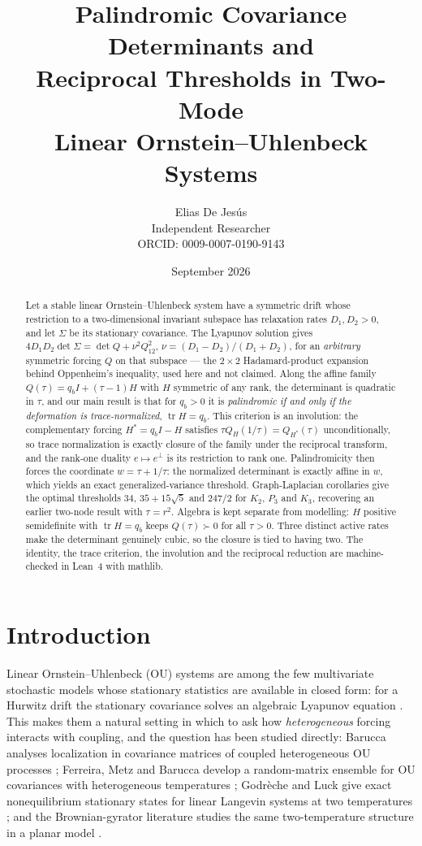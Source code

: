 \documentclass[11pt]{article}
\title{Palindromic Covariance Determinants and\\
Reciprocal Thresholds in Two-Mode\\
Linear Ornstein--Uhlenbeck Systems}
\author{Elias De Jes\'us\\
Independent Researcher\\
ORCID: 0009-0007-0190-9143}
\date{September 2026}
\theoremstyle{plain}
\theoremstyle{definition}
\theoremstyle{remark}
\newcommand{\tr}{\operatorname{tr}}
\newcommand{\Sig}{\Sigma}
\newcommand{\eperp}{e^{\perp}}
\begin{document}
\maketitle

\begin{abstract}
Let a stable linear Ornstein--Uhlenbeck system have a symmetric drift whose restriction to a
two-dimensional invariant subspace has relaxation rates $D_1,D_2>0$, and let $\Sig$ be its
stationary covariance. The Lyapunov solution gives
$4D_1D_2\det\Sig=\det Q+\nu^2Q_{12}^2$, $\nu=(D_1-D_2)/(D_1+D_2)$, for an \emph{arbitrary}
symmetric forcing $Q$ on that subspace --- the $2\times2$ Hadamard-product expansion behind
Oppenheim's inequality, used here and not claimed. Along the affine family
$Q(\tau)=q_bI+(\tau-1)H$ with $H$ symmetric of any rank, the determinant is quadratic in $\tau$,
and our main result is that for $q_b>0$ it is \emph{palindromic if and only if the deformation is
trace-normalized}, $\tr H=q_b$. This criterion is an involution: the complementary forcing
$H^{*}=q_bI-H$ satisfies $\tau Q_H(1/\tau)=Q_{H^{*}}(\tau)$ unconditionally, so trace
normalization is exactly closure of the family under the reciprocal transform, and the rank-one
duality $e\mapsto\eperp$ is its restriction to rank one. Palindromicity then forces the
coordinate $w=\tau+1/\tau$: the normalized determinant is exactly affine in $w$, which yields an
exact generalized-variance threshold. Graph-Laplacian corollaries give the optimal thresholds
$34$, $35+15\sqrt5$ and $247/2$ for $K_2$, $P_3$ and $K_3$, recovering an earlier two-node result
with $\tau=r^2$. Algebra is kept separate from modelling: $H$ positive semidefinite with
$\tr H=q_b$ keeps $Q(\tau)\succ0$ for all $\tau>0$. Three distinct active rates make the
determinant genuinely cubic, so the closure is tied to having two. The identity, the trace
criterion, the involution and the reciprocal reduction are machine-checked in Lean~4 with mathlib.
\end{abstract}

\section{Introduction}\label{sec:intro}

Linear Ornstein--Uhlenbeck (OU) systems are among the few multivariate stochastic models whose
stationary statistics are available in closed form: for a Hurwitz drift the stationary
covariance solves an algebraic Lyapunov equation
\cite{UhlenbeckOrnstein1930,Gardiner2004,Vatiwutipong2019}. This makes them a natural setting in
which to ask how \emph{heterogeneous} forcing interacts with coupling, and the question has been
studied directly: Barucca analyses localization in covariance matrices of coupled heterogeneous
OU processes \cite{Barucca2014}; Ferreira, Metz and Barucca develop a random-matrix ensemble for
OU covariances with heterogeneous temperatures \cite{FerreiraMetzBarucca2025}; Godr\`eche and
Luck give exact nonequilibrium stationary states for linear Langevin systems at two temperatures
\cite{GodrecheLuck2019}; and the Brownian-gyrator literature studies the same two-temperature
structure in a planar model \cite{FilligerReimann2007,DotsenkoEtAl2013}.
\end{document}
